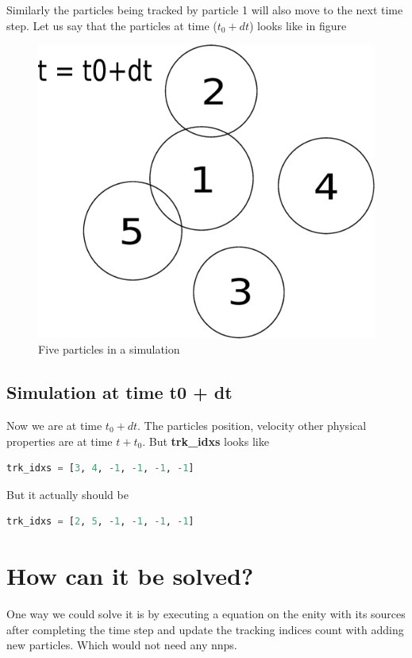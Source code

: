 Similarly the particles being tracked by particle 1 will also move to the next
time step. Let us say that the particles at time ($t_0+dt$) looks like in figure


\begin{figure}[H]
\centering
\includegraphics[scale=0.2]{figures/pars_t0_dt.eps}
\caption{Five particles in a simulation\label{fig:pars_t0_dt_sim}}
\end{figure}

\subsection{Simulation at time t0 + dt}
\label{sec-4-2}
Now we are at time $t_0 + dt$. The particles position, velocity other physical
properties are at time $t+t_0$. But \textbf{trk\_idxs} looks like

\begin{lstlisting}[language=Python]
     trk_idxs = [3, 4, -1, -1, -1, -1]
\end{lstlisting}

But it actually should be

\begin{lstlisting}[language=Python]
     trk_idxs = [2, 5, -1, -1, -1, -1]
\end{lstlisting}


\section{How can it be solved?}
\label{sec-5}
One way we could solve it is by executing a equation on the enity with its
sources after completing the time step and update the tracking indices count
with adding new particles. Which would not need any nnps.

